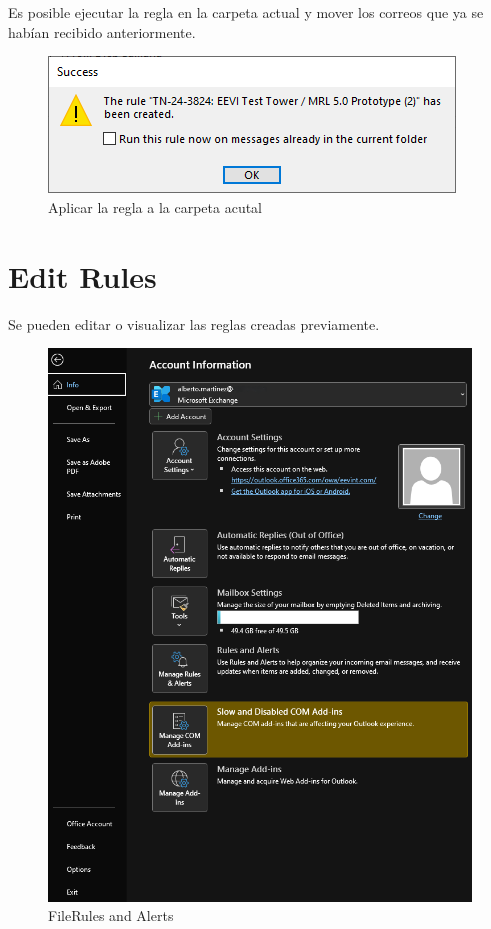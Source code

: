 \documentclass{report}
\begin{document}
Es posible ejecutar la regla en la carpeta actual y mover los correos que ya se habían recibido anteriormente.

\begin{figure}[H]
	\centering
	\includegraphics[width=0.75\linewidth, height=0.35\textheight,keepaspectratio]{Imagenes/outlook_rules05}
	\caption{Aplicar la regla a la carpeta acutal}
	\label{fig:outlookrules05}
\end{figure}

\section{Edit Rules}

Se pueden editar o visualizar las reglas creadas previamente.

\begin{figure}[H]
	\centering
	\includegraphics[width=0.75\linewidth, height=0.45\textheight,keepaspectratio]{Imagenes/outlook_rules06}
	\caption{File\textrightarrow Rules and Alerts}
	\label{fig:outlookrules06}
\end{figure}
\end{document}
